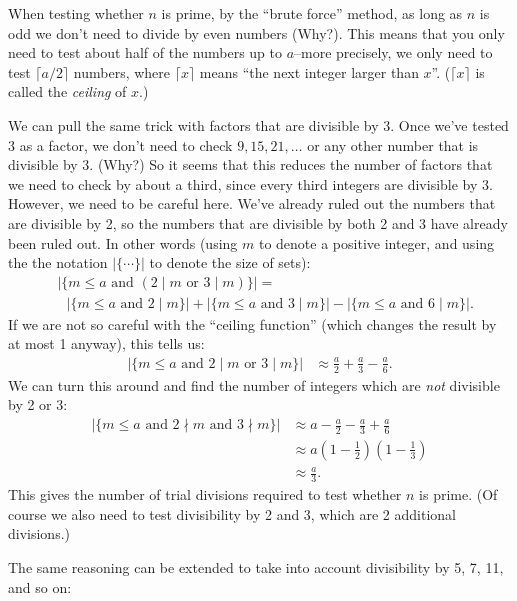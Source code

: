 When testing whether $n$ is prime, by the ``brute force'' method, as long as $n$ is odd we don't need to divide by even numbers (Why?). 
This means that you only need to test about half of the numbers up to $a$--more precisely, we only need to test $\lceil a/2 \rceil$ numbers, where $\lceil x \rceil$ means ``the next integer larger than $x$''. ($\lceil x \rceil$ is called the \emph{ceiling} of $x$.) 

We can pull the same trick with factors that are divisible by 3.  Once we've tested 3 as a factor, we don't need to check $9, 15, 21, \ldots$ or any other number that is divisible by 3.  (Why?)  So it seems that this reduces the number of factors that we need to check by about a third, since every third integers are divisible by 3. However, we need to be careful here. We've already ruled out the numbers that are divisible by 2, so the numbers that are divisible by both 2 and 3 have already been ruled out. In other words (using $m$ to denote a positive integer, and using the the notation $| \{ \cdots \} |$ to denote the size of sets):
\begin{align*}
&| \{ m \le a \text{ and } (2 \mid m \text{ or } 3 \mid m) \}| =\\ 
&~~~| \{ m \le a  \text{ and } 2 \mid m \}| + | \{ m \le a  \text{ and } 3 \mid m \}| - | \{ m \le a  \text{ and } 6 \mid m \}|.
\end{align*}
If we are not so careful with the ``ceiling function'' (which changes the result by at most 1 anyway), this tells us:
\begin{align*}
| \{ m \le a \text{ and } 2 \mid m \text{ or } 3 \mid m \}| &\approx 
\frac{a}{2} + \frac{a}{3} -\frac{a}{6}.
\end{align*}
We can turn this around and find the number of integers which are \emph{not} divisible by 2 or 3:
\begin{align*}
| \{ m \le a \text{ and } 2 \nmid m \text{ and } 3 \nmid m \}| &\approx 
a - \frac{a}{2} - \frac{a}{3} + \frac{a}{6} \\
&\approx a\left(1 - \frac{1}{2}\right) \left(1 - \frac{1}{3}\right)\\
&\approx \frac{a}{3}.
\end{align*}
This gives the number of trial divisions required to test whether $n$ is prime. (Of course we also need to test divisibility by 2 and 3, which are 2 additional divisions.)

The same reasoning can be extended to take into account divisibility by 5, 7, 11, and so on:

